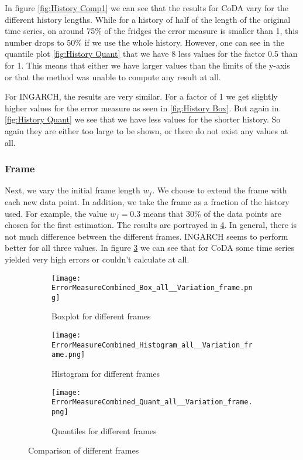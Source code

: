 In figure \ref{fig:History Comp1} we can see that the results for CoDA vary for the different history lengths. While for a history of half of the length of the original time series, on around 75\% of the fridges the error measure is smaller than 1, this number drops to 50\% if we use the whole history. However, one can see in the quantile plot \ref{fig:History Quant} that we have 8 less values for the factor 0.5 than for 1. This means that either we have larger values than the limits of the y-axis or that the method was unable to compute any result at all. 

For INGARCH, the results are very similar. For a factor of 1 we get slightly higher values for the error measure as seen in \ref{fig:History Box}. But again in \ref{fig:History Quant} we see that we have less values for the shorter history. So again they are either too large to be shown, or there do not exist any values at all. 

\subsubsection{Frame}
\label{sec:Frame}

Next, we vary the initial frame length $w_f$. We choose to extend the frame with each new data point. In addition, we take the frame as a fraction of the history used. For example, the value $w_f=0.3$ means that 30\% of the data points are chosen for the first estimation. The results are portrayed in \ref{fig:Frame Comp1}. In general, there is not much difference between the different frames. INGARCH seems to perform better for all three values. In figure \ref{fig:Frame Quant} we can see that for CoDA some time series yielded very high errors or couldn't calculate at all. 
\begin{figure}[htb!]
\centering
\begin{subfigure}[b]{0.45\textwidth}
\texttt{[image: ErrorMeasureCombined\_Box\_all\_\_Variation\_frame.png]}
\caption{Boxplot for different frames}
\label{fig:Frame Box}
\end{subfigure}
\hfill
\begin{subfigure}[b]{0.45\textwidth}
\texttt{[image: ErrorMeasureCombined\_Histogram\_all\_\_Variation\_frame.png]}
\caption{Histogram for different frames}
\label{fig:Frame Hist}
\end{subfigure}
\hfill
\begin{subfigure}[b]{0.8\textwidth}
\texttt{[image: ErrorMeasureCombined\_Quant\_all\_\_Variation\_frame.png]}
\caption{Quantiles for different frames}
\label{fig:Frame Quant}
\end{subfigure}
\caption{Comparison of different frames}
\label{fig:Frame Comp1}
\end{figure}



